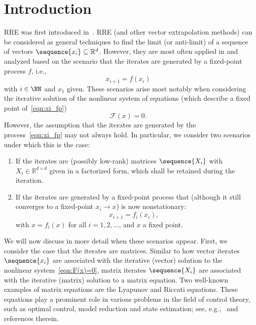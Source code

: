 \section{Introduction}
\Ac{RRE} was first introduced in~\cite{eddy1979extrapolating, kaniel1974least}.
\ac{RRE} (and other vector extrapolation methods) can be considered as general
techniques to find the limit (or anti-limit) of a sequence of vectors
$\sequence{x_i}\subseteq\mathbb{R}^{d}$.
However, they are most often applied in and analyzed based on the scenario that the iterates are generated by a fixed-point process $f$, i.e.,
\begin{equation}
	x_{i+1} = f(x_i)
	\label{eqn:xi_fp}
\end{equation}
with $i\in\NN$ and $x_1$ given.
These scenarios arise most notably when considering the iterative solution of the nonlinear system of equations (which describe a fixed point of~\eqref{eqn:xi_fp})
\begin{equation}
	\mathscr F(x) = 0.
	\label{eqn:F(x)=0}
\end{equation}
However, the assumption that the iterates are generated by the process~\eqref{eqn:xi_fp} may not always hold.
In particular, we consider two scenarios under which this is the case:
\begin{enumerate}
	\item If the iterates are (possibly low-rank) matrices $\sequence{X_i}$ with $X_i \in \mathbb{R}^{d \times d}$ given in a factorized form, which shall be retained during the iteration.
	\item If the iterates are generated by a fixed-point process that (although it still converges to a fixed-point $x_i \rightarrow x$) is now nonstationary:
		\begin{equation}
			x_{i+1} = f_i(x_i),
			\label{eqn:xi_fp_iteration_dependent}
		\end{equation}
		with $x = f_i(x)$ for all $i = 1, 2, \dots$, and $x$ a fixed point.
\end{enumerate}
We will now discuss in more detail when these scenarios appear.
First, we consider the case that the iterates are matrices.
Similar to how vector iterates $\sequence{x_i}$ are associated with the iterative (vector) solution to the nonlinear system~\eqref{eqn:F(x)=0}, matrix iterates $\sequence{X_i}$ are associated with the iterative (matrix) solution to a matrix equation.
Two well-known examples of matrix equations are the Lyapunov and Riccati equations.
These equations play a prominent role in various problems in the field of
control theory, such as optimal control, model reduction and state estimation;
see, e.g.,~\cite[Section~3]{simoncini2016computational} and references therein.

